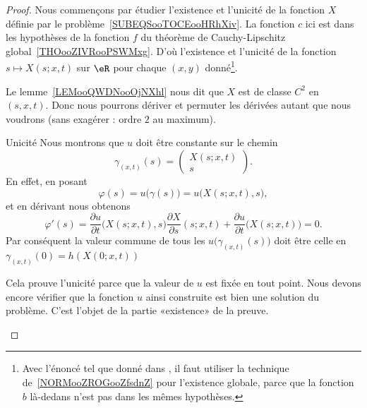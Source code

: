 \begin{proof}
    Nous commençons par étudier l'existence et l'unicité de la fonction \( X\) définie par le problème~\ref{SUBEQSooTOCEooHRhXiv}. La fonction \( c\) ici est dans les hypothèses de la fonction $f$ du théorème de Cauchy-Lipschitz global~\ref{THOooZIVRooPSWMxg}. D'où l'existence et l'unicité de la fonction \( s\mapsto X(s;x,t)\) sur \( \eR\) pour chaque \( (x,y)\) donné\footnote{Avec l'énoncé tel que donné dans \cite{ooAUICooVUjyqo}, il faut utiliser la technique de~\ref{NORMooZROGooZfsdnZ} pour l'existence globale, parce que la fonction \( b\) là-dedans n'est pas dans les mêmes hypothèses.}.

    Le lemme~\ref{LEMooQWDNooOjNXhl} nous dit que \( X\) est de classe \( C^2\) en \( (s,x,t)\). Donc nous pourrons dériver et permuter les dérivées autant que nous voudrons (sans exagérer : ordre \( 2\) au maximum).

    \begin{subproof}
        \item[Unicité]
            Nous montrons que \( u\) doit être constante sur le chemin
            \begin{equation}
                \gamma_{(x,t)}(s)=\begin{pmatrix}
                    X(s;x,t)    \\
                    s
                \end{pmatrix}.
            \end{equation}
            En effet, en posant
            \begin{equation}
                \varphi(s)=u\big( \gamma(s) \big)=u\big( X(s;x,t),s \big),
            \end{equation}
            et en dérivant nous obtenons
            \begin{equation}
                \varphi'(s)=\frac{ \partial u }{ \partial t }\big( X(s;x,t),s \big)\frac{ \partial X }{ \partial s }(s;x,t)+\frac{ \partial u }{ \partial t }\big( X(s;x,t) \big)=0.
            \end{equation}
            Par conséquent la valeur commune de tous les \(   u\big( \gamma_{(x,t)}(s) \big)    \) doit être celle en \( \gamma_{(x,t)}(0)=h(  X(0;x,t)  ) \)

            Cela prouve l'unicité parce que la valeur de \( u\) est fixée en tout point. Nous devons encore vérifier que la fonction \( u\) ainsi construite est bien une solution du problème. C'est l'objet de la partie «existence» de la preuve.


\end{subproof}
\end{proof}
